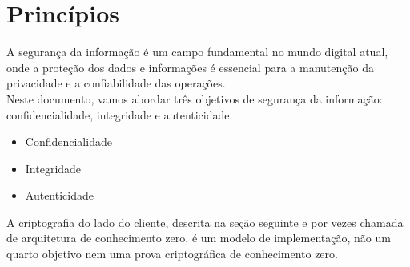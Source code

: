 \section{Princípios}
A segurança da informação é um campo fundamental no mundo digital atual, onde a proteção dos dados e informações é essencial para a manutenção da privacidade e a confiabilidade das operações.\\
Neste documento, vamos abordar três objetivos de segurança da informação: confidencialidade, integridade e autenticidade.

\begin{itemize}
	\item Confidencialidade
	\item Integridade
	\item Autenticidade
\end{itemize}

A criptografia do lado do cliente, descrita na seção seguinte e por vezes chamada de arquitetura de conhecimento zero, é um modelo de implementação, não um quarto objetivo nem uma prova criptográfica de conhecimento zero.

\pagebreak
